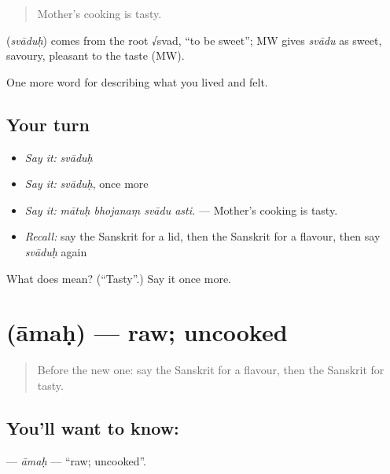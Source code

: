 \begin{quote}
Mother's cooking is tasty.
\end{quote}

\begin{cousinweb}
\textbf{} (\emph{svāduḥ}) comes from the root √svad, \textquotedblleft{}to be sweet\textquotedblright{}; MW gives \emph{svādu} as sweet, savoury, pleasant to the taste (MW).
\end{cousinweb}

\begin{grammarlens}[title={What you've built}]
One more word for describing what you lived and felt.
\end{grammarlens}

\subsection*{Your turn}
\begin{itemize}
\raggedright
  \item \emph{Say it:} \emph{svāduḥ}
  \item \emph{Say it:} \emph{svāduḥ}, once more
  \item \emph{Say it:} \emph{mātuḥ bhojanaṃ svādu asti.} — Mother's cooking is tasty.
  \item \emph{Recall:} say the Sanskrit for a lid, then the Sanskrit for a flavour, then say \emph{svāduḥ} again
\end{itemize}

\begin{tcolorbox}[breakable,colback=teal!4,colframe=teal!35!black,title={Before you move on}]
What does  mean? (\textquotedblleft{}Tasty\textquotedblright{}.) Say it once more.
\end{tcolorbox}
\section[\texorpdfstring{\sk{आमः} (āmaḥ)}{आमः (āmaḥ)}]{ (āmaḥ) — raw; uncooked}

\label{lesson:SA-C515-amah}



\begin{quote}
Before the new one: say the Sanskrit for a flavour, then the Sanskrit for tasty.
\end{quote}

\subsection*{You'll want to know: }
\textbf{} — \emph{āmaḥ} — \textquotedblleft{}raw; uncooked\textquotedblright{}.

